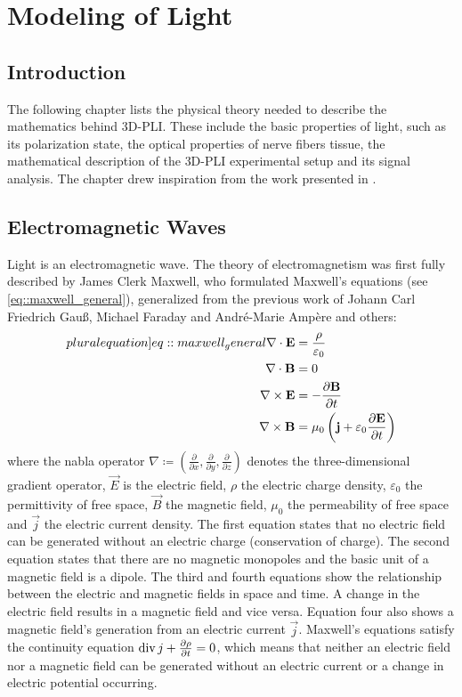 \cleardoublepage
\setcounter{chapter}{2}
\chapter{Modeling of Light}
\label{sec:theory}
%
\section{Introduction}
% 
The following chapter lists the physical theory needed to describe the mathematics behind \ac{3D-PLI}.
These include the basic properties of light, such as its polarization state, the optical properties of nerve fibers tissue, the mathematical description of the \ac{3D-PLI} experimental setup and its signal analysis.
The chapter drew inspiration from the work presented in \cite{demtroeder2, Fliebach2012}.
%
%
%
\section{Electromagnetic Waves}
%
Light is an electromagnetic wave.
The theory of electromagnetism was first fully described by James Clerk Maxwell, who formulated Maxwell's equations (see \cref{eq::maxwell_general}), generalized from the previous work of Johann Carl Friedrich Gau{\ss}, Michael Faraday and Andr{\'e}-Marie Amp{\`e}re and others:
%
\begin{align}
\begin{split} \label[pluralequation]{eq::maxwell_general}
    \nabla \cdot \vec{E} &= \frac {\rho} {\varepsilon_0}\\
    \nabla \cdot \vec{B} &= 0\\
    \nabla \times \vec{E} &= -\frac{\partial \vec{B}} {\partial t}\\
    \nabla \times \vec{B} &= \mu_0 \left( \vec{j} + \varepsilon_0 \frac{\partial \vec{E}} {\partial t} \right)
\end{split}
\end{align}
%
where the nabla operator $\nabla \coloneqq \left({\frac{\partial}{\partial x}}, {\frac{\partial}{\partial y}}, {\frac{\partial}{\partial z}} \right)$ denotes the three-dimensional gradient operator, $\vec{E}$ is the electric field, $\rho$ the electric charge density, $\varepsilon_0$ the permittivity of free space, $\vec{B}$ the magnetic field, $\mu_0$ the permeability of free space and $\vec{j}$ the electric current density.
The first equation states that no electric field can be generated without an electric charge (conservation of charge).
The second equation states that there are no magnetic monopoles and the basic unit of a magnetic field is a dipole.
The third and fourth equations show the relationship between the electric and magnetic fields in space and time.
A change in the electric field results in a magnetic field and vice versa.
Equation four also shows a magnetic field's generation from an electric current $\vec{j}$.
Maxwell's equations satisfy the continuity equation $\operatorname{div} j + \frac{\partial \rho}{\partial t} = 0$, which means that neither an electric field nor a magnetic field can be generated without an electric current or a change in electric potential occurring.
%
%
